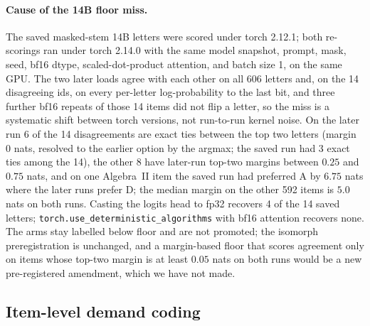 \paragraph{Cause of the 14B floor miss.}
The saved masked-stem 14B letters were scored under torch 2.12.1; both re-scorings ran under torch 2.14.0 with the same model snapshot, prompt, mask, seed, bf16 dtype, scaled-dot-product attention, and batch size 1, on the same GPU. The two later loads agree with each other on all 606 letters and, on the 14 disagreeing ids, on every per-letter log-probability to the last bit, and three further bf16 repeats of those 14 items did not flip a letter, so the miss is a systematic shift between torch versions, not run-to-run kernel noise. On the later run 6 of the 14 disagreements are exact ties between the top two letters (margin 0 nats, resolved to the earlier option by the argmax; the saved run had 3 exact ties among the 14), the other 8 have later-run top-two margins between $0.25$ and $0.75$ nats, and on one Algebra~II item the saved run had preferred A by $6.75$ nats where the later runs prefer D; the median margin on the other 592 items is $5.0$ nats on both runs. Casting the logits head to fp32 recovers 4 of the 14 saved letters; \texttt{torch.use\_deterministic\_algorithms} with bf16 attention recovers none. The arms stay labelled below floor and are not promoted; the isomorph preregistration is unchanged, and a margin-based floor that scores agreement only on items whose top-two margin is at least $0.05$ nats on both runs would be a new pre-registered amendment, which we have not made.

\subsection{Item-level demand coding}
\label{app:coders}

